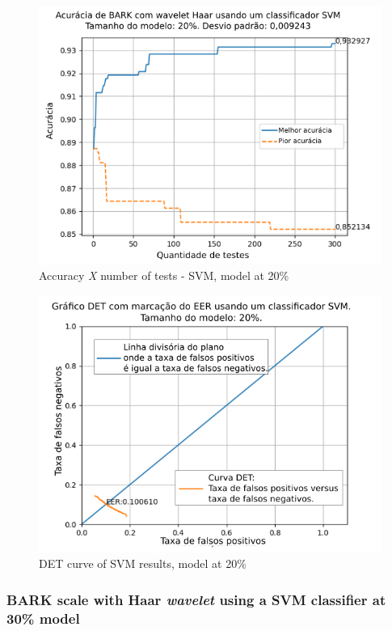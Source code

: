 			
			
			\begin{figure}[h]
				\centering
				\includegraphics[width=.95\linewidth]{images/results/confusionMatrices/classifier_SVM_20.png}
				\caption{Accuracy \textit{X} number of tests - SVM, model at 20\%}
				\label{fig:classifiersvm20}
			\end{figure}
			
			\begin{figure}[h]
				\centering
				\includegraphics[width=.9\linewidth]{images/results/det/DET_SVM_20}
				\caption{DET curve of SVM results, model at 20\%}
				\label{fig:detsvm20}
			\end{figure}
		
		\subsubsection{BARK scale with Haar \textit{wavelet} using a SVM classifier at 30\% model}
			
			
